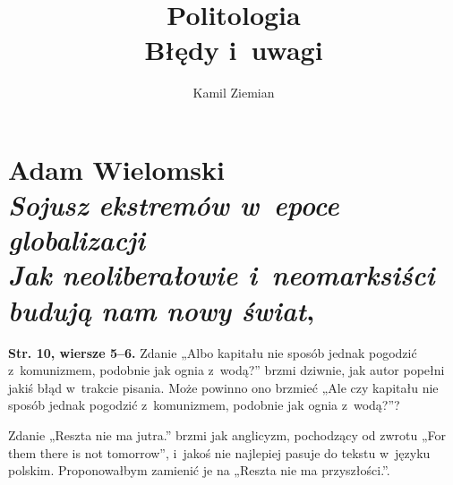 \documentclass[a4paper,11pt]{article}
\title{Politologia \\
  {\Large Błędy i~uwagi}}
\author{Kamil Ziemian}
\numberwithin{equation}{section}
\begin{document}





\maketitle  %











\section{ %
  Adam Wielomski \\
  \textit{Sojusz ekstremów w~epoce globalizacji} \\
  \textit{Jak neoliberałowie i~neomarksiści budują nam nowy świat},
  \cite{WielomskiSojuszEkstremowETC2021}}

\vspace{0em}



\vspace{0em}


\noindent
\textbf{Str. 10, wiersze 5--6.} Zdanie „Albo kapitału nie sposób jednak
pogodzić z~komunizmem, podobnie jak ognia z~wodą?” brzmi dziwnie,
jak autor popełni jakiś błąd w~trakcie pisania. Może powinno ono brzmieć
„Ale czy kapitału nie sposób jednak pogodzić z~komunizmem, podobnie jak
ognia z~wodą?”?

\VerSpaceFour





\noindent
{} Zdanie „Reszta nie ma jutra.” brzmi jak anglicyzm,
pochodzący od zwrotu „For them there is not tomorrow”, i~jakoś nie
najlepiej pasuje do tekstu w~języku polskim. Proponowałbym zamienić je na
„Reszta nie ma przyszłości.”.
\end{document}
